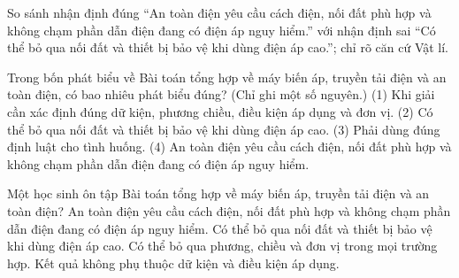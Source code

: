 \begin{bt}
So sánh nhận định đúng “An toàn điện yêu cầu cách điện, nối đất phù hợp và không chạm phần dẫn điện đang có điện áp nguy hiểm.” với nhận định sai “Có thể bỏ qua nối đất và thiết bị bảo vệ khi dùng điện áp cao.”; chỉ rõ căn cứ Vật lí.
\end{bt}

\begin{ex}
Trong bốn phát biểu về Bài toán tổng hợp về máy biến áp, truyền tải điện và an toàn điện, có bao nhiêu phát biểu đúng? (Chỉ ghi một số nguyên.) (1) Khi giải cần xác định đúng dữ kiện, phương chiều, điều kiện áp dụng và đơn vị. (2) Có thể bỏ qua nối đất và thiết bị bảo vệ khi dùng điện áp cao. (3) Phải dùng đúng định luật cho tình huống. (4) An toàn điện yêu cầu cách điện, nối đất phù hợp và không chạm phần dẫn điện đang có điện áp nguy hiểm.
\end{ex}

\begin{ex}
Một học sinh ôn tập Bài toán tổng hợp về máy biến áp, truyền tải điện và an toàn điện?
\choice
{\True An toàn điện yêu cầu cách điện, nối đất phù hợp và không chạm phần dẫn điện đang có điện áp nguy hiểm.}
{Có thể bỏ qua nối đất và thiết bị bảo vệ khi dùng điện áp cao.}
{Có thể bỏ qua phương, chiều và đơn vị trong mọi trường hợp.}
{Kết quả không phụ thuộc dữ kiện và điều kiện áp dụng.}
\end{ex}

